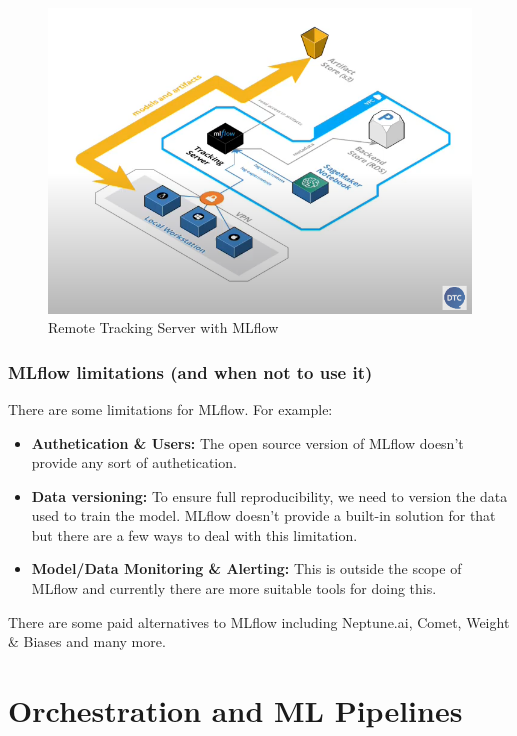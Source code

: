 \documentclass[letterpaper,12pt,notitlepage,twoside]{report}
\begin{document}
\begin{figure}[h]
	\centering
	\includegraphics[width=\textwidth]{Images/remote tracking-mlflow.png}
	\caption{Remote Tracking Server with MLflow}
	\label{fig:6}
\end{figure}
\FloatBarrier

\subsection{MLflow limitations (and when not to use it)}
There are some limitations for MLflow. For example:
\begin{itemize}[noitemsep, topsep=0pt]
\item \textbf{Authetication \& Users:} The open source version of MLflow doesn't provide any sort of authetication.
\item \textbf{Data versioning:} To ensure full reproducibility, we need to version the data used to train the model. MLflow doesn't provide a built-in solution for that but there are a few ways to deal with this limitation.
\item \textbf{Model/Data Monitoring \& Alerting:} This is outside the scope of MLflow and currently there are more suitable tools for doing this.
\end{itemize}

There are some paid alternatives to MLflow including Neptune.ai, Comet, Weight \& Biases and many more. 

\chapter{Orchestration and ML Pipelines} \label{ch:3}
\end{document}
